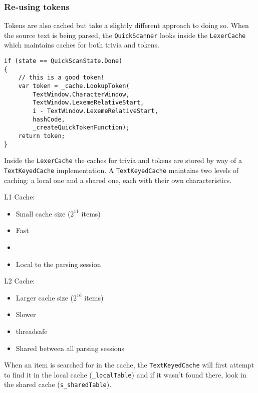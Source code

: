 \begin{minipage}{\linewidth}
\subsubsection{Re-using tokens}
\label{sec:re-use-tokens}

Tokens are also cached but take a slightly different approach to doing so. When the source text is being parsed, the \texttt{QuickScanner} looks inside the \texttt{LexerCache} which maintains caches for both trivia and tokens.

\begin{lstlisting}
if (state == QuickScanState.Done)
{
	// this is a good token!
	var token = _cache.LookupToken(
	    TextWindow.CharacterWindow,
	    TextWindow.LexemeRelativeStart,
	    i - TextWindow.LexemeRelativeStart,
	    hashCode,
	    _createQuickTokenFunction);
	return token;
}
\end{lstlisting}
\end{minipage}

Inside the \texttt{LexerCache} the caches for trivia and tokens are stored by way of a \texttt{TextKeyedCache} implementation. A \texttt{TextKeyedCache} maintains two levels of caching: a local one and a shared one, each with their own characteristics.

\noindent L1 Cache:

\begin{itemize}
\item Small cache size ($2^{11}$ items)
\item Fast
\item {}
\item Local to the parsing session
\end{itemize}

\noindent L2 Cache:

\begin{itemize}
\item Larger cache size ($2^{16}$ items)
\item Slower
\item \Gls{threadsafe}
\item Shared between all parsing sessions
\end{itemize}

\noindent When an item is searched for in the cache, the \texttt{TextKeyedCache} will first attempt to find it in the local cache (\texttt{\_localTable}) and if it wasn't found there, look in the shared cache (\texttt{s\_sharedTable}).

